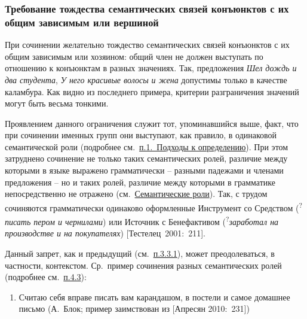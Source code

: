 \hypertarget{ux442ux440ux435ux431ux43eux432ux430ux43dux438ux435-ux442ux43eux436ux434ux435ux441ux442ux432ux430-ux441ux435ux43cux430ux43dux442ux438ux447ux435ux441ux43aux438ux445-ux441ux432ux44fux437ux435ux439-ux43aux43eux43dux44aux44eux43dux43aux442ux43eux432-ux441-ux438ux445-ux43eux431ux449ux438ux43c-ux437ux430ux432ux438ux441ux438ux43cux44bux43c-ux438ux43bux438-ux432ux435ux440ux448ux438ux43dux43eux439}{%
\subsubsection{Требование тождества семантических связей конъюнктов с их
общим зависимым или
вершиной}\label{ux442ux440ux435ux431ux43eux432ux430ux43dux438ux435-ux442ux43eux436ux434ux435ux441ux442ux432ux430-ux441ux435ux43cux430ux43dux442ux438ux447ux435ux441ux43aux438ux445-ux441ux432ux44fux437ux435ux439-ux43aux43eux43dux44aux44eux43dux43aux442ux43eux432-ux441-ux438ux445-ux43eux431ux449ux438ux43c-ux437ux430ux432ux438ux441ux438ux43cux44bux43c-ux438ux43bux438-ux432ux435ux440ux448ux438ux43dux43eux439}}

При сочинении желательно тождество семантических связей конъюнктов с их
общим зависимым или хозяином: общий член не должен выступать по
отношению к конъюнктам в разных значениях. Так, предложения \emph{Шел
дождь и два студента}, \emph{У него красивые волосы и жена} допустимы
только в качестве каламбура. Как видно из последнего примера, критерии
разграничения значений могут быть весьма тонкими.

Проявлением данного ограничения служит тот, упоминавшийся выше, факт,
что при сочинении именных групп они выступают, как правило, в одинаковой
семантической роли (подробнее см.~\underline{п.1.~Подходы к
определению}). При этом затруднено сочинение не только таких
семантических ролей, различие между которыми в языке выражено
грамматически -- разными падежами и членами предложения -- но и таких
ролей, различие между которыми в грамматике непосредственно не отражено
(см.~\underline{Семантические роли}). Так, с трудом сочиняются
грамматически одинаково оформленные Инструмент со Средством
(\textsuperscript{?}\emph{писать пером и чернилами}) или Источник с
Бенефактивом (\textsuperscript{?}\emph{заработал на производстве и на
покупателях}) {[}Тестелец~2001:~211{]}.

Данный запрет, как и предыдущий (см.~\underline{п.3.3.1}), может
преодолеваться, в частности, контекстом. Ср.~пример сочинения разных
семантических ролей (подробнее см.~\underline{п.4.3}):

\begin{enumerate}
\def\labelenumi{(\arabic{enumi})}
\setcounter{enumi}{16}
\item
  Считаю себя вправе писать вам карандашом, в постели и самое домашнее
  письмо (А.~Блок; пример заимствован из {[}Апресян 2010:~231{]})
\end{enumerate}

